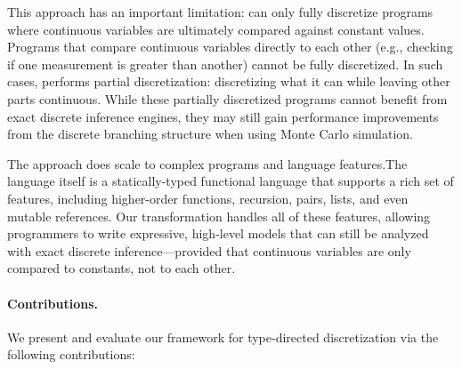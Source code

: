 This approach has an important limitation: \Slice{} can only fully discretize programs where continuous variables are ultimately compared against constant values. Programs that compare continuous variables directly to each other (e.g., checking if one measurement is greater than another) cannot be fully discretized. In such cases, \Slice{} performs partial discretization: discretizing what it can while leaving other parts continuous. While these partially discretized programs cannot benefit from exact discrete inference engines, they may still gain performance improvements from the discrete branching structure when using Monte Carlo simulation.

The approach does scale to complex programs and language features.The \Slice{} language itself is a statically-typed functional language that supports a rich set of features, including higher-order functions, recursion, pairs, lists, and even mutable references. Our transformation handles all of these features, allowing programmers to write expressive, high-level models that can still be analyzed with exact discrete inference—provided that continuous variables are only compared to constants, not to each other.

\paragraph{Contributions.}
We present and evaluate our framework for type-directed discretization via the following contributions:

